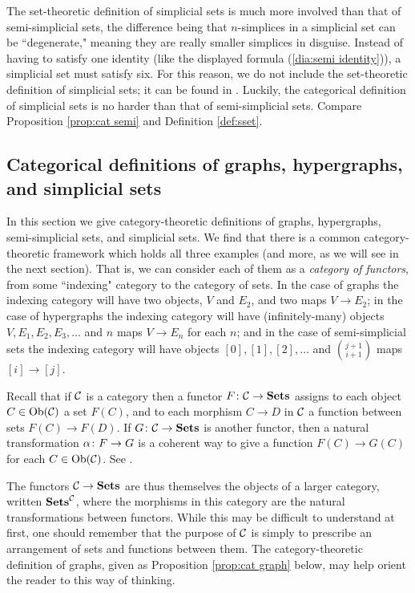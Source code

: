\documentclass{amsart}
\begin{document}
The set-theoretic definition of simplicial sets is much more involved than that of semi-simplicial sets, the difference being that $n$-simplices in a simplicial set can be ``degenerate," meaning they are really smaller simplices in disguise.  Instead of having to satisfy one identity (like the displayed formula (\ref{dia:semi identity})), a simplicial set must satisfy six.  For this reason, we do not include the set-theoretic definition of simplicial sets; it can be found in \cite{GJ}.  Luckily, the categorical definition of simplicial sets is no harder than that of semi-simplicial sets.   Compare Proposition \ref{prop:cat semi} and Definition \ref{def:sset}.




\subsection{Categorical definitions of graphs, hypergraphs, and simplicial sets}\label{subsec:cat defs}

In this section we give category-theoretic definitions of graphs, hypergraphs, semi-simplicial sets, and simplicial sets.  We find that there is a common category-theoretic framework which holds all three examples (and more, as we will see in the next section).  That is, we can consider each of them as a {\em category of functors}, from some ``indexing" category to the category of sets.  In the case of graphs the indexing category will have two objects, $V$ and $E_2$, and two maps $V\to E_2$; in the case of hypergraphs the indexing category will have (infinitely-many) objects $V,E_1,E_2,E_3,\ldots$ and $n$ maps $V\to E_n$ for each $n$; and in the case of semi-simplicial sets the indexing category will have objects $[0],[1],[2],\ldots$ and ${j+1}\choose{i+1}$ maps $[i]\to[j]$.

Recall that if $\mathcal{C}$ is a category then a functor $F\colon\mathcal{C}\rightarrow{\bf Sets}$ assigns to each object $C\in\textnormal{Ob}(\mathcal{C})$ a set $F(C)$, and to each morphism $C\to D$ in $\mathcal{C}$ a function between sets $F(C)\to F(D)$.  If $G\colon\mathcal{C}\rightarrow{\bf Sets}$ is another functor, then a natural transformation $\alpha\colon F\rightarrow G$ is a coherent way to give a function $F(C)\to G(C)$ for each $C\in\textnormal{Ob}(\mathcal{C})$.  See \cite{MacLane}.

The functors $\mathcal{C}\rightarrow{\bf Sets}$ are thus themselves the objects of a larger category, written ${\bf Sets}^\mathcal{C}$, where the morphisms in this category are the natural transformations between functors.  While this may be difficult to understand at first, one should remember that the purpose of $\mathcal{C}$ is simply to prescribe an arrangement of sets and functions between them.  The category-theoretic definition of graphs, given as Proposition \ref{prop:cat graph} below, may help orient the reader to this way of thinking.
\end{document}
